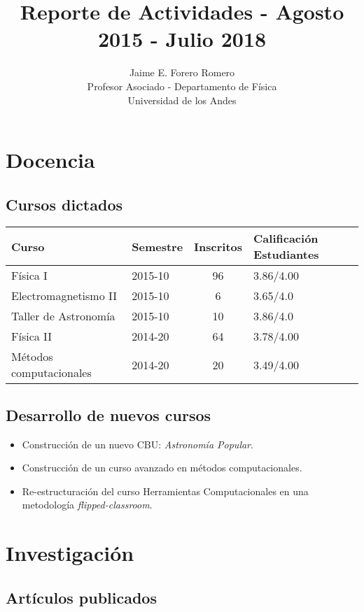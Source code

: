 \documentclass{article}
\title{Reporte de Actividades - Agosto 2015 - Julio 2018}
\author{Jaime E. Forero Romero\\Profesor Asociado - Departamento de
  F\'isica\\Universidad de los Andes}
\begin{document}
\maketitle
\tableofcontents
\newpage

\section{Docencia}

\subsection{Cursos dictados}
\begin{tabular}{p{6.0cm} l c p{2cm}}\hline
Curso & Semestre & Inscritos & Calificaci\'on Estudiantes\\\hline
F\'isica I & 2015-10 & 96 & 3.86/4.00 \\
Electromagnetismo II & 2015-10 & 6 & 3.65/4.0 \\
Taller de Astronom\'ia & 2015-10 & 10 & 3.86/4.0\\
F\'isica II & 2014-20 & 64 & 3.78/4.00\\
M\'etodos computacionales & 2014-20 & 20 & 3.49/4.00\\\hline
\end{tabular}

\subsection{Desarrollo de nuevos cursos}
\begin{itemize}
\item Construcci\'on de un nuevo CBU: \emph{Astronom\'ia Popular}.
\item Construcci\'on de un curso avanzado en m\'etodos computacionales.
\item Re-estructuraci\'on del curso Herramientas Computacionales en
  una metodolog\'ia \emph{flipped-classroom}.
\end{itemize}

\section{Investigaci\'on}

\subsection{Art\'iculos publicados}
\end{document}
